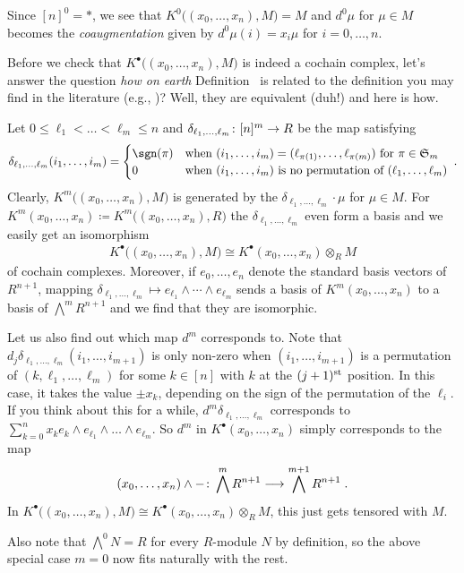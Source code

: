 \documentclass[a4paper,parskip=half,numbers=enddot, DIV=12]{scrreprt}
\renewcommand{\leq}{\leqslant}
\begin{document}
Since $[n]^0=*$,  we see that $K^0\big((x_0,\ldots,x_n),M\big)=M$ and $d^0\mu$ for $\mu\in M$ becomes the \emph{coaugmentation} given by $d^0\mu(i)=x_i\mu$ for $i=0,\ldots,n$.
\begin{rem}
	 Before we check that $K^\bullet\big((x_0,\ldots,x_n),M\big)$ is indeed a cochain complex, let's answer the question \emph{how on earth} Definition~ is related to the definition you may find in the literature (e.g., \cite[p.~423]{eisenbudCommAlg})? Well, they are equivalent (duh!) and here is how.
	 
	 Let $0\leq\ell_1<\ldots< \ell_m\leq n$ and $\delta_{\ell_1,\ldots,\ell_m}\colon [n]^m\morphism R$ be the map satisfying 
	 \begin{align*}
	 	\delta_{\ell_1,\ldots,\ell_m}(i_1,\ldots,i_m)=\begin{cases}
		 	\sgn(\pi) & \text{when }(i_1,\ldots,i_m)=(\ell_{\pi(1)},\ldots,\ell_{\pi(m)})\text{ for }\pi\in\SS_{m}\\
		 	0 & \text{when }(i_1,\ldots,i_m)\text{ is no permutation of }(\ell_1,\ldots,\ell_m)
	 	\end{cases}\;.
	 \end{align*}
	  Clearly, $K^m\big((x_0,\ldots,x_n),M\big)$ is generated by the $\delta_{\ell_1,\ldots,\ell_m}\cdot \mu$ for $\mu\in M$. For $K^m(x_0,\ldots,x_n)\coloneqq K^m\big((x_0,\ldots,x_n),R\big)$ the $\delta_{\ell_1,\ldots,\ell_m}$ even form a basis and we easily get an isomorphism
	  \begin{align*}
	  	K^\bullet\big((x_0,\ldots,x_n),M\big)\cong K^\bullet(x_0,\ldots,x_n)\otimes_R M
	  \end{align*}
	  of cochain complexes. Moreover, if $e_0,\ldots,e_n$ denote the standard basis vectors of $R^{n+1}$, mapping $\delta_{\ell_1,\ldots,\ell_m}\mapsto e_{\ell_1}\wedge \cdots\wedge e_{\ell_m}$ sends a basis of $K^m(x_0,\ldots,x_n)$ to a basis of $\bigwedge^mR^{n+1}$ and we find that they are isomorphic.
	  
	  Let us also find out which map $d^m$ corresponds to. Note that $d_j\delta_{\ell_1,\ldots,\ell_m}(i_1,\ldots,i_{m+1})$ is only non-zero when $(i_1,\ldots,i_{m+1})$ is a permutation of $(k,\ell_1,\ldots,\ell_m)$ for some $k\in[n]$ with $k$ at the $(j+1)^{\text{st}}$ position. In this case, it takes the value $\pm x_k$, depending on the sign of the permutation of the $\ell_i$. If you think about this for a while, $d^m\delta_{\ell_1,\ldots,\ell_m}$ corresponds to $\sum_{k=0}^nx_ke_k\wedge e_{\ell_1}\wedge \ldots \wedge e_{\ell_m}$. So $d^m$ in $K^\bullet(x_0,\ldots,x_n)$ simply corresponds to the map
	  \begin{align*}
	  	(x_0,\ldots,x_n)\wedge -\colon \bigwedge^mR^{n+1}\morphism \bigwedge^{m+1}R^{n+1}\;.
	  \end{align*}
	  In $K^\bullet\big((x_0,\ldots,x_n),M\big)\cong K^\bullet(x_0,\ldots,x_n)\otimes_R M$, this just gets tensored with $M$.
	  
	  Also note that $\bigwedge^0N=R$ for every $R$-module $N$ by definition, so the above special case $m=0$ now fits naturally with the rest.
\end{rem}
\end{document}

